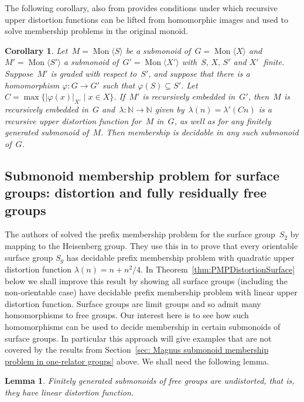 \documentclass[11pt]{amsart}
\newcommand{\Mgen}[1]{\operatorname{Mon}\bigl\langle #1 \bigr\rangle}
\newcommand{\N}{\mathbb{N}}
\theoremstyle{plain}
\newtheorem{lemma}[theorem]{Lemma}
\newtheorem{cor}[theorem]{Corollary}
\theoremstyle{definition}
\begin{document}
The following corollary, also from \cite{margolis2005distortion}
provides
conditions under which recursive upper distortion functions can be lifted from homomorphic images and used to solve membership problems in the original monoid.

\begin{cor}\cite[Corollary~1.13]{margolis2005distortion}\label{cor:distortion:membership}
Let~$M = \Mgen{S}$ be a submonoid of~$G = \Mgen{X}$ and~$M' = \Mgen{S'}$ a submonoid of~$G' = \Mgen{X'}$ with~$S, \, X, \, S'$ and  $X'~$ finite. 
Suppose~$M'$ is graded with respect to~$S'$, and suppose that there is a homomorphism 
$\varphi \colon G \rightarrow G'$ such that $\varphi(S) \subseteq S'$. 
Let $C = \max\{|\varphi (x)|_{X'} \mid x \in X\}$.
If~$M'$ is recursively embedded in~$G'$, then~$M$ is recursively embedded in~$G$ and~$\lambda \colon \N \rightarrow \N$ given by~$\lambda(n) = \lambda'(Cn)$ is a recursive upper distortion function for~$M$ in~$G$, as well as for any finitely generated submonoid of~$M$. Then membership is decidable in any such submonoid of~$G$.
\end{cor}


\subsection{Submonoid membership problem for surface groups: distortion and fully residually free groups}\label{sed: Submonoid membership problem for surface groups: distortion and fully residually free groups}

The authors of \cite{margolis2005distortion} solved the prefix membership problem for the surface group~$S_2$ by mapping to the Heisenberg group. They use this in \cite[Proposition 2.10]{margolis2005distortion} to prove that 
every orientable surface group $S_g$ has decidable prefix membership problem with quadratic upper distortion function $\lambda(n) = n + n^2/4$.  
In Theorem~\ref{thm:PMPDistortionSurface} below we shall improve this result by showing all surface groups (including the non-orientable case) have decidable prefix membership problem with linear upper distortion function.   
Surface groups are limit groups and so admit many homomorphisms to free groups. Our interest here is to see how such homomorphisms can be used to decide membership in certain submonoids of surface groups. In particular this approach will give examples that are not covered by the results from   Section~\ref{sec: Magnus submonoid membership problem in one-relator groups} above. 
We shall need the following lemma. 
\begin{lemma}\label{submonoids of free groups are un-distorted}
Finitely generated submonoids of free groups are undistorted, that is, they have linear distortion function. 
\end{lemma}
\end{document}
